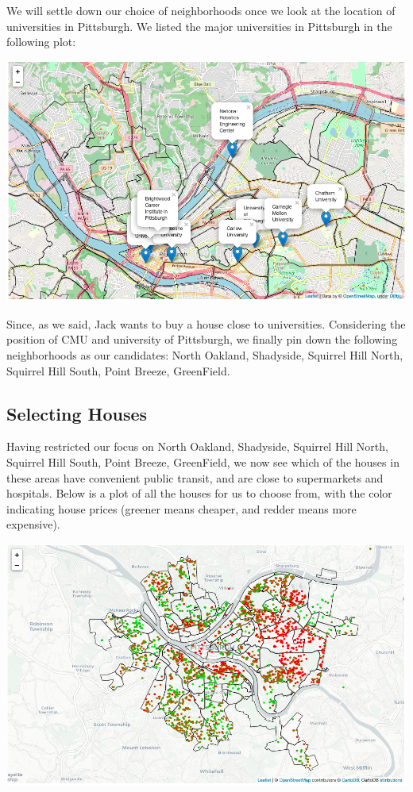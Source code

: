 \documentclass[11pt,notitlepage]{article}
\begin{document}
We will settle down our choice of neighborhoods once
we look at the location of universities in Pittsburgh.
We listed the major universities in Pittsburgh in the following plot:
\begin{center}
    \includegraphics[scale=0.35]{univ.png}
\end{center}
Since, as we said, Jack wants to buy a house close to
universities. Considering the position of CMU and university of Pittsburgh,
we finally pin down the following neighborhoods as our candidates:
North Oakland, Shadyside, Squirrel Hill North, Squirrel Hill South,
Point Breeze, GreenField.

\subsection{Selecting Houses}
Having restricted our focus on North Oakland, Shadyside, Squirrel Hill North, Squirrel Hill South,
Point Breeze, GreenField, we now see which of the houses in these
areas have convenient public transit, and are close to supermarkets and hospitals.
Below is a plot of all the houses for us to choose from,
with the color indicating house prices (greener means cheaper, and redder means more expensive).
\begin{center}
    \includegraphics[scale=0.35]{houses.png}
\end{center}
\end{document}
